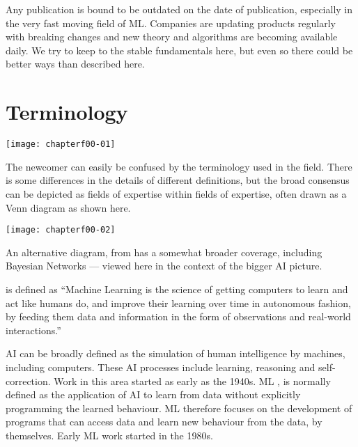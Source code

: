 Any publication is bound to be outdated on the date of publication, especially in the very fast moving field of \ac{ML}. Companies are updating products regularly with breaking changes and new theory and algorithms are becoming available daily. We try to keep to the stable fundamentals here, but even so there could be better ways than described here.

\section*{Terminology}

\begin{marginfigure}
\texttt{[image: chapterf00-01]}
\end{marginfigure}


The newcomer can easily be confused by the terminology used in the field.  There is some differences in the details of different definitions, but the broad consensus can be depicted as fields of expertise within fields of expertise, often drawn as a Venn diagram as shown here.


\begin{marginfigure}
    \texttt{[image: chapterf00-02]}
    \end{marginfigure}
An alternative diagram, from \cite{Kallianosa2019} has a somewhat broader coverage, including Bayesian Networks --- viewed here in the context of the bigger \ac{AI} picture.

 is defined as \cite{DanielFaggella2019} ``Machine Learning is the science of getting computers to learn and act like humans do, and improve their learning over time in autonomous fashion, by feeding them data and information in the form of observations and real-world interactions.''

\ac{AI} can be broadly defined as the simulation of human intelligence by machines, including computers. These \ac{AI} processes include learning, reasoning and self-correction. Work in this area started as early as the 1940s. \ac{ML} \cite{WikiPediaMachineLearning2019,DanielFaggella2019}, is normally defined as the application of \ac{AI} to learn from data without explicitly programming the learned behaviour. \ac{ML} therefore focuses on the development of programs that can access data and learn new behaviour from the data, by themselves.  Early ML work started in the 1980s. 

